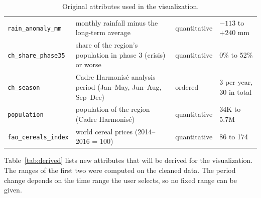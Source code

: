 \documentclass{article}
\begin{document}
\begin{table}[H]
\begin{tabularx}{\linewidth}{l X l X}
    \texttt{rain\_anomaly\_mm} & monthly rainfall minus the long-term average & quantitative & $-113$ to $+240$ mm \\
    \texttt{ch\_share\_phase35} & share of the region's population in phase 3 (crisis) or worse & quantitative & 0\% to 52\% \\
    \texttt{ch\_season} & Cadre Harmonis\'e analysis period (Jan--May, Jun--Aug, Sep--Dec) & ordered & 3 per year, 30 in total \\
    \texttt{population} & population of the region (Cadre Harmonis\'e) & quantitative & 34K to 5.7M \\
    \texttt{fao\_cereals\_index} & world cereal prices (2014--2016 = 100) & quantitative & 86 to 174 \\
    \hline
  \end{tabularx}
  \caption{Original attributes used in the visualization.}
  \label{tab:attributes}
\end{table}

Table~\ref{tab:derived} lists new attributes that will be derived for the visualization. The ranges of the first two were computed on the cleaned data. The period change depends on the time range the user selects, so no fixed range can be given.
\end{document}
